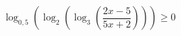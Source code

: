 \begin{ex}[type=inequality]
	\begin{condition}
		\( \log_{0,5}\left( \log_2\left( \log_3\left( \dfrac{2x-5}{5x+2} \right) \right) \right)\ge0 \)
	\end{condition}
	\answer{\( \left( -\dfrac{11}{13};-\dfrac{23}{43} \right] \)}
\end{ex}